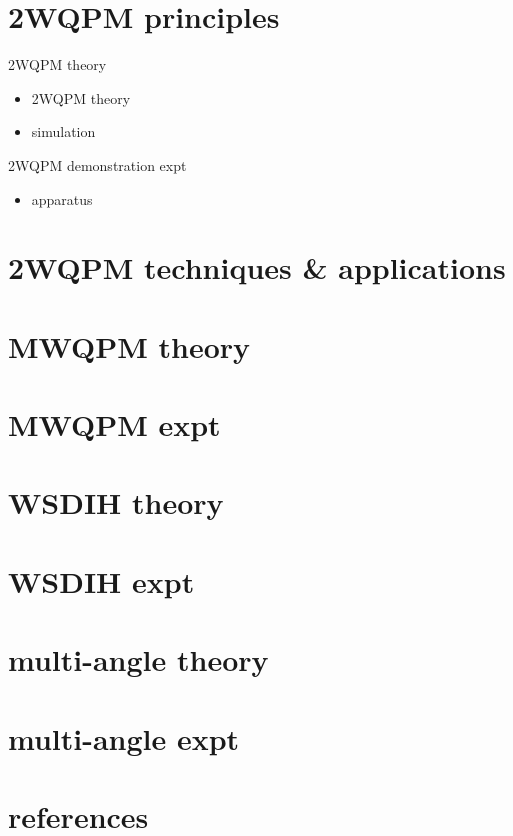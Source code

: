 \documentclass[t, aspectratio=169]{beamer}
\begin{document}
\section{2WQPM principles}

\begin{frame}{2WQPM theory}
	\begin{itemize}
		\item 2WQPM theory
		\item simulation
	\end{itemize}
\end{frame}


\begin{frame}{2WQPM demonstration expt}
	\begin{itemize}
		\item apparatus
	\end{itemize}
\end{frame}


\section{2WQPM techniques \& applications}



\section{MWQPM theory}



\section{MWQPM expt}



\section{WSDIH theory}



\section{WSDIH expt}



\section{multi-angle theory}



\section{multi-angle expt}



\section{references}



\frame{ }
\end{document}
